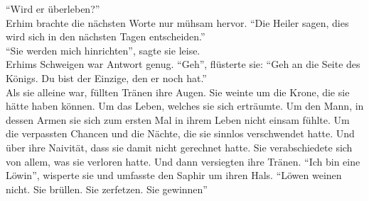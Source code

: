 ``Wird er überleben?''\\
Erhim brachte die nächsten Worte nur mühsam hervor. ``Die Heiler sagen, dies wird sich in den 
nächsten Tagen entscheiden.''\\
``Sie werden mich hinrichten'', sagte sie leise.\\
Erhims Schweigen war Antwort genug. ``Geh'', flüsterte sie: ``Geh an die Seite des Königs. Du bist 
der Einzige, den er noch hat.''\\
Als sie alleine war, füllten Tränen ihre Augen. Sie weinte um die Krone, die sie hätte haben 
können. Um das Leben, welches sie sich erträumte. Um den Mann, in dessen Armen sie sich zum ersten 
Mal in ihrem Leben nicht einsam fühlte. Um die verpassten Chancen und die Nächte, die sie sinnlos 
verschwendet hatte. Und über ihre Naivität, dass sie damit nicht gerechnet hatte. Sie 
verabschiedete sich von allem, was sie verloren hatte. Und dann versiegten ihre Tränen. ``Ich bin 
eine Löwin'', wisperte sie und umfasste den Saphir um ihren Hals. ``Löwen weinen nicht. Sie 
brüllen. Sie zerfetzen. Sie gewinnen''\\


